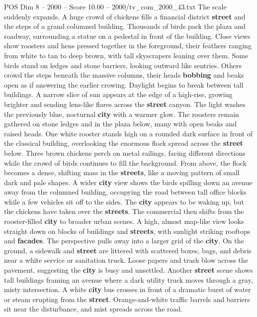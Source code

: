 \begin{textsample}{POS Dim 8 – 2000 – Score 10.00 – 2000/tv\_com\_2000\_43.txt}
The scale suddenly expands.
A huge crowd of chickens fills a financial district \textbf{street} and the steps of a grand columned building.
Thousands of birds pack the plaza and roadway, surrounding a statue on a pedestal in front of the building.
Close views show roosters and hens pressed together in the foreground, their feathers ranging from white to tan to deep brown, with tall skyscrapers leaning over them.
Some birds stand on ledges and stone barriers, looking outward like sentries.
Others crowd the steps beneath the massive columns, their heads \textbf{bobbing} and beaks open as if answering the earlier crowing.
Daylight begins to break between tall buildings.
A narrow slice of sun appears at the edge of a high-rise, growing brighter and sending lens-like flares across the \textbf{street} canyon.
The light washes the previously blue, nocturnal \textbf{city} with a warmer glow.
The roosters remain gathered on stone ledges and in the plaza below, many with open beaks and raised heads.
One white rooster stands high on a rounded dark surface in front of the classical building, overlooking the enormous flock spread across the \textbf{street} below.
Three brown chickens perch on metal railings, facing different directions while the crowd of birds continues to fill the background.
From above, the flock becomes a dense, shifting mass in the \textbf{streets}, like a moving pattern of small dark and pale shapes.
A wider \textbf{city} view shows the birds spilling down an avenue away from the columned building, occupying the road between tall office blocks while a few vehicles sit off to the sides.
The \textbf{city} appears to be waking up, but the chickens have taken over the \textbf{streets}.
The commercial then shifts from the rooster-filled \textbf{city} to broader urban scenes.
A high, almost map-like view looks straight down on blocks of buildings and \textbf{streets}, with sunlight striking rooftops and \textbf{facades}.
The perspective pulls away into a larger grid of the \textbf{city}.
On the ground, a sidewalk and \textbf{street} are littered with scattered boxes, bags, and debris near a white service or sanitation truck.
Loose papers and trash blow across the pavement, suggesting the \textbf{city} is busy and unsettled.
Another \textbf{street} scene shows tall buildings framing an avenue where a dark utility truck moves through a gray, misty intersection.
A white \textbf{city} bus crosses in front of a dramatic burst of water or steam erupting from the \textbf{street}.
Orange-and-white traffic barrels and barriers sit near the disturbance, and mist spreads across the road.

\end{textsample}
